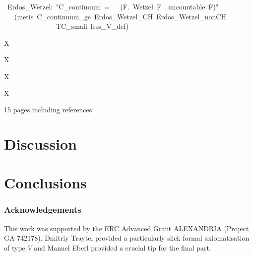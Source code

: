 \documentclass[runningheads]{llncs}
\begin{document}
\begin{isabelle}
\ Erdos\_Wetzel:\ "C\_continuum\ =\ \ \isasymlongleftrightarrow \ (\isasymexists F.\ Wetzel\ F\ \isasymand \ uncountable\ F)"\isanewline
\ \ \ (metis\ C\_continuum\_ge\ Erdos\_Wetzel\_CH\ Erdos\_Wetzel\_nonCH\isanewline
\ \ \ \ \ \ \ \ \ \ \ \ \ \ \ TC\_small\ less\_V\_def)
\end{isabelle}

\begin{isabelle}
X
\end{isabelle}

\begin{isabelle}
X
\end{isabelle}

\begin{isabelle}
X
\end{isabelle}

\begin{isabelle}
X
\end{isabelle}



15 pages including references


\section{Discussion}

\section{Conclusions}

\subsubsection{Acknowledgements} 
This work was supported by the ERC Advanced Grant ALEXANDRIA (Project GA 742178). 
Dmitriy Traytel provided a particularly slick formal axiomatisation of type $V$ and Manuel Eberl provided a crucial tip for the final part.



\end{document}
